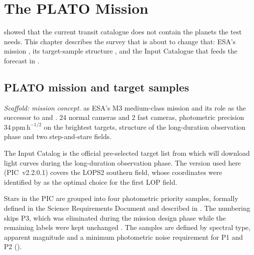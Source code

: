 \chapter{The PLATO Mission}
\label{chap:plato_mission}

 showed that the current transit catalogue does
not contain the planets the \HZIED test needs.  This chapter describes
the survey that is about to change that: ESA's \PLATO mission
\parencite{Rauer2016,ESA2017PLATO}, its target-sample structure
\parencite{Nascimbeni2022}, and the \PLATO Input Catalogue that feeds
the forecast in .


\section{PLATO mission and target samples}
\label{sec:plato_mission}
\label{sec:plato_target_samples}
\label{sec:pic_integration}
\label{sec:plato_samples}

\emph{Scaffold: mission concept.}
\PLATO as ESA's M3 medium-class mission and its role as the successor
to \Kepler{} and \TESS{}.  24 normal cameras and 2 fast cameras,
photometric precision $34\,\mathrm{ppm}\,\mathrm{h}^{-1/2}$ on the
brightest targets, structure of the long-duration observation phase
and two step-and-stare fields.


\label{sec:pic}

The \PLATO Input Catalog \parencite{Montalto2021} is the official
pre-selected target list from which \PLATO will download light curves
during the long-duration observation phase.  The version used here
(PIC~v2.2.0.1) covers the LOPS2 southern field, whose coordinates were
identified by \textcite{Nascimbeni2022} as the optimal choice for the
first LOP field.

Stars in the PIC are grouped into four photometric priority samples,
formally defined in the \PLATO Science Requirements Document and
described in \textcite{Nascimbeni2022}. The numbering skips P3, which
was eliminated during the mission design phase while the remaining labels
were kept unchanged \parencite{Nascimbeni2022}.  The samples are defined
by spectral type, apparent magnitude and a minimum
photometric noise requirement for P1 and P2
().

